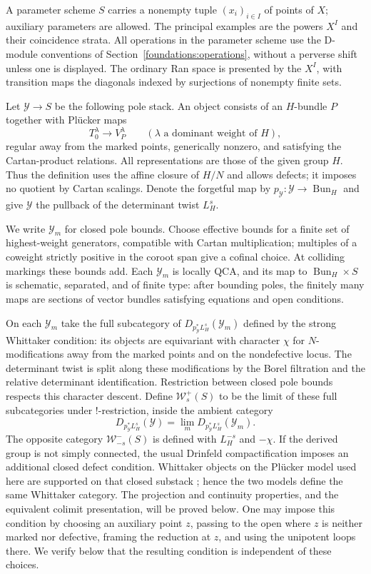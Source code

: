 \documentclass[11pt]{article}
\numberwithin{equation}{section}
\theoremstyle{definition}
\theoremstyle{remark}
\begin{document}
A parameter scheme $S$ carries a nonempty tuple $(x_i)_{i\in I}$ of points
of $X$; auxiliary parameters are allowed. The principal examples are the
powers $X^I$ and their coincidence strata. All operations in the parameter
scheme use the D-module conventions of Section~\ref{foundations:operations},
without a perverse shift unless one is displayed. The ordinary Ran space
is presented by the $X^I$, with transition maps the diagonals indexed by
surjections of nonempty finite sets.

Let $\mathcal Y\to S$ be the following pole stack. An object consists of an
$H$-bundle $P$ together with Pl\"ucker maps
\[
 T_0^\lambda\longrightarrow V_P^\lambda
 \qquad(\lambda\text{ a dominant weight of }H),
\]
regular away from the marked points, generically nonzero, and satisfying
the Cartan-product relations. All representations are those of the given
group $H$. Thus the definition uses the affine closure of $H/N$ and allows
defects; it imposes no quotient by Cartan scalings. Denote the forgetful map
by $p_{\mathcal Y}:\mathcal Y\to\operatorname{Bun}_H$ and give $\mathcal Y$
the pullback of the determinant twist $L_H^s$.

We write $\mathcal Y_m$ for closed pole bounds. Choose effective bounds for
a finite set of highest-weight generators, compatible with Cartan
multiplication; multiples of a coweight strictly positive in the coroot
span give a cofinal choice. At colliding markings these bounds add. Each
$\mathcal Y_m$ is locally QCA, and its map to
$\operatorname{Bun}_H\times S$ is schematic, separated, and of finite type:
after bounding poles, the finitely many maps are sections of vector bundles
satisfying equations and open conditions.

On each $\mathcal Y_m$ take the full subcategory of
$D_{p_{\mathcal Y}^*L_H^s}(\mathcal Y_m)$ defined by the strong Whittaker
condition: its objects are equivariant with character $\chi$ for
$N$-modifications away from the marked points and on the nondefective
locus. The determinant twist is split along these modifications by the
Borel filtration and the relative determinant identification. Restriction
between closed pole bounds respects this character descent. Define
$\mathcal W_s^+(S)$ to be the limit of these full subcategories under
$!$-restriction, inside the ambient category
\[
 D_{p_{\mathcal Y}^*L_H^s}(\mathcal Y)
 =\lim_m D_{p_{\mathcal Y}^*L_H^s}(\mathcal Y_m).
\]
The opposite category $\mathcal W_{-s}^-(S)$ is defined with $L_H^{-s}$
and $-\chi$. If the derived group is not simply connected, the usual
Drinfeld compactification imposes an additional closed defect condition.
Whittaker objects on the Pl\"ucker model used here are supported on that
closed substack \cite[Remark~4.1.2]{GaitsgoryWhit}; hence the two models
define the same Whittaker category. The projection and continuity properties, and the equivalent
colimit presentation, will be proved below. One may impose this condition by choosing an auxiliary point $z$, passing
to the open where $z$ is neither marked nor defective, framing the
reduction at $z$, and using the unipotent loops there. We verify below that
the resulting condition is independent of these choices.
\end{document}
